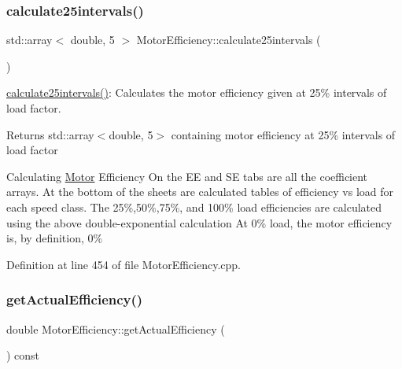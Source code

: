 \mbox{\label{class_motor_efficiency_a4135d26efe506365d9ecb7c15f43f35d}} 
\subsubsection{\texorpdfstring{calculate25intervals()}{calculate25intervals()}}
{\footnotesize\ttfamily std\+::array$<$ double, 5 $>$ Motor\+Efficiency\+::calculate25intervals (\begin{DoxyParamCaption}{ }\end{DoxyParamCaption})}

\hyperlink{class_motor_efficiency_a4135d26efe506365d9ecb7c15f43f35d}{calculate25intervals()}\+: Calculates the motor efficiency given at 25\% intervals of load factor. \begin{DoxyReturn}{Returns}
std\+::array$<$double, 5$>$ containing motor efficiency at 25\% intervals of load factor 
\end{DoxyReturn}
Calculating \hyperlink{struct_motor}{Motor} Efficiency On the EE and SE tabs are all the coefficient arrays. At the bottom of the sheets are calculated tables of efficiency vs load for each speed class. The 25\%,50\%,75\%, and 100\% load efficiencies are calculated using the above double-\/exponential calculation At 0\% load, the motor efficiency is, by definition, 0\%

Definition at line 454 of file Motor\+Efficiency.\+cpp.

\mbox{\label{class_motor_efficiency_ae40031307b8631cf40df1c4069069dc0}} 
\subsubsection{\texorpdfstring{get\+Actual\+Efficiency()}{getActualEfficiency()}}
{\footnotesize\ttfamily double Motor\+Efficiency\+::get\+Actual\+Efficiency (\begin{DoxyParamCaption}{ }\end{DoxyParamCaption}) const\hspace{0.3cm}{\ttfamily [inline]}}

